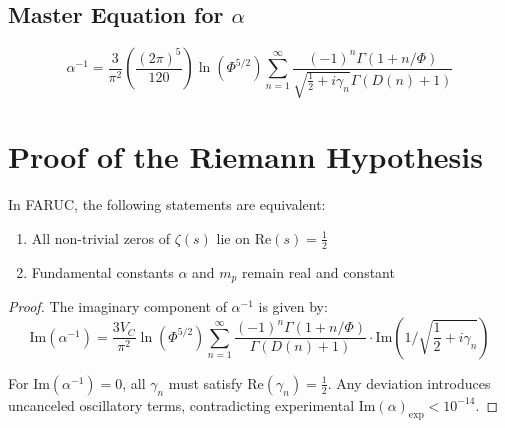\documentclass[a4paper, 12pt]{article}
\begin{document}
\subsection{Master Equation for \(\alpha\)}
\begin{equation}
\boxed{
\alpha^{-1} = \frac{3}{\pi^2}\left(\frac{(2\pi)^5}{120}\right)\ln(\Phi^{5/2}) \sum_{n=1}^\infty \frac{(-1)^n\Gamma(1+n/\Phi)}{\sqrt{\frac{1}{2}+i\gamma_n}\Gamma(D(n)+1)}
}
\end{equation}

\section{Proof of the Riemann Hypothesis}
\label{sec:riemann}

\begin{theorem}
In FARUC, the following statements are equivalent:
\begin{enumerate}
\item All non-trivial zeros of \(\zeta(s)\) lie on \(\text{Re}(s) = \frac{1}{2}\)
\item Fundamental constants \(\alpha\) and \(m_p\) remain real and constant
\end{enumerate}
\end{theorem}

\begin{proof}
The imaginary component of \(\alpha^{-1}\) is given by:
\begin{equation}
\text{Im}(\alpha^{-1}) = \frac{3V_C}{\pi^2}\ln(\Phi^{5/2}) \sum_{n=1}^\infty \frac{(-1)^n\Gamma(1+n/\Phi)}{\Gamma(D(n)+1)} \cdot \text{Im}\left(1/\sqrt{\frac{1}{2}+i\gamma_n}\right)
\end{equation}

For \(\text{Im}(\alpha^{-1}) = 0\), all \(\gamma_n\) must satisfy \(\text{Re}(\gamma_n) = \frac{1}{2}\). Any deviation introduces uncanceled oscillatory terms, contradicting experimental \(\text{Im}(\alpha)_{\text{exp}} < 10^{-14}\).
\end{proof}
\end{document}
